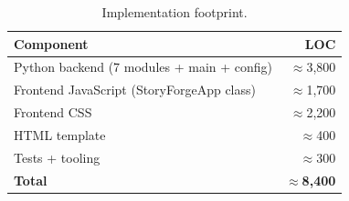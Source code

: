 \begin{table}[!t]
\caption{Implementation footprint.}
\label{tab:loc}
\centering
\renewcommand{\arraystretch}{1.1}
\begin{tabular}{@{}lr@{}}
\toprule
\textbf{Component}                                & \textbf{LOC} \\
\midrule
Python backend (7 modules + main + config)        & $\approx$3{,}800 \\
Frontend JavaScript (StoryForgeApp class)         & $\approx$1{,}700 \\
Frontend CSS                                      & $\approx$2{,}200 \\
HTML template                                     & $\approx$400 \\
Tests + tooling                                   & $\approx$300 \\
\midrule
\textbf{Total}                                    & $\approx$\textbf{8{,}400} \\
\bottomrule
\end{tabular}
\end{table}
